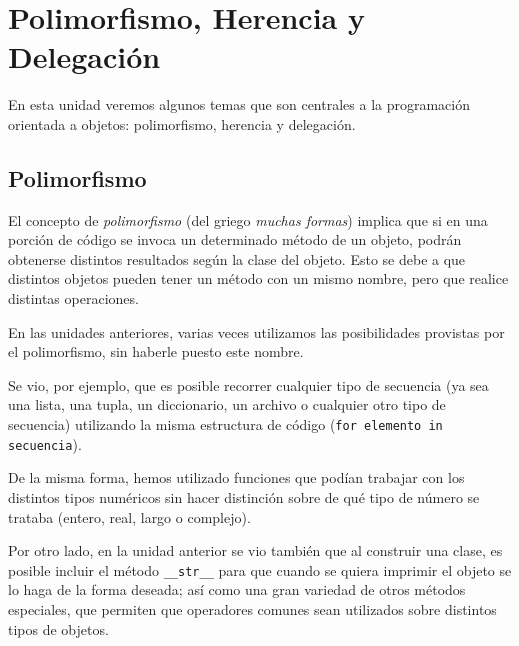 
%

\chapter{Polimorfismo, Herencia y Delegación}

En esta unidad veremos algunos temas que son centrales a la programación
orientada a objetos: polimorfismo, herencia y delegación.

\section{Polimorfismo}

El concepto de {\it polimorfismo} (del griego {\it muchas formas}) implica
que si en una porción de código se invoca un determinado método de un
objeto, podrán obtenerse distintos resultados según la clase del objeto.
Esto se debe a que distintos objetos pueden tener un método con un mismo
nombre, pero que realice distintas operaciones.

En las unidades anteriores, varias veces utilizamos las posibilidades
provistas por el polimorfismo, sin haberle puesto este nombre.

Se vio, por ejemplo, que es posible recorrer cualquier tipo de secuencia
(ya sea una lista, una tupla, un diccionario, un archivo o cualquier otro tipo
de secuencia) utilizando la misma estructura de código
(\lstinline!for elemento in secuencia!).

De la misma forma, hemos utilizado funciones que podían trabajar con los
distintos tipos numéricos sin hacer distinción sobre de qué tipo de número
se trataba (entero, real, largo o complejo).

Por otro lado, en la unidad anterior se vio también que al construir una
clase, es posible incluir el método \lstinline!__str__! para que cuando se
quiera imprimir el objeto se lo haga de la forma deseada; así como una
gran variedad de otros métodos especiales, que permiten que operadores
comunes sean utilizados sobre distintos tipos de objetos.

